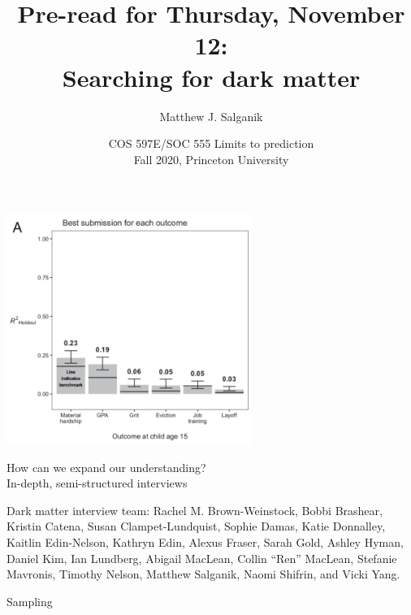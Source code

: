 \documentclass[aspectratio=169]{beamer}
\title[]{Pre-read for Thursday, November 12:\\Searching for dark matter}
\author[]{Matthew J. Salganik}
\institute[]{}
\date[]{COS 597E/SOC 555 Limits to prediction\\Fall 2020, Princeton University}
\begin{document}
\frame{\titlepage}
\begin{frame}

\begin{center}
\includegraphics[width = 0.6\textwidth]{figures/salganik_measuring_2020_fig2a}
\end{center}

\end{frame}
\begin{frame}

\begin{center}
{\Large How can we expand our understanding?}\\ 
\vspace{0.5in}
\pause
{\Large In-depth, semi-structured interviews}
\end{center}

\vfill
Dark matter interview team: Rachel M. Brown-Weinstock, Bobbi Brashear, Kristin Catena, Susan Clampet-Lundquist, Sophie Damas, Katie Donnalley, Kaitlin Edin-Nelson, Kathryn Edin, Alexus Fraser, Sarah Gold, Ashley Hyman, Daniel Kim, Ian Lundberg, Abigail MacLean, Collin ``Ren'' MacLean, Stefanie Mavronis, Timothy Nelson, Matthew Salganik, Naomi Shifrin, and Vicki Yang.
\end{frame}
\begin{frame}

\begin{center}
{\Large Sampling}
\end{center}

\end{frame}
\end{document}
